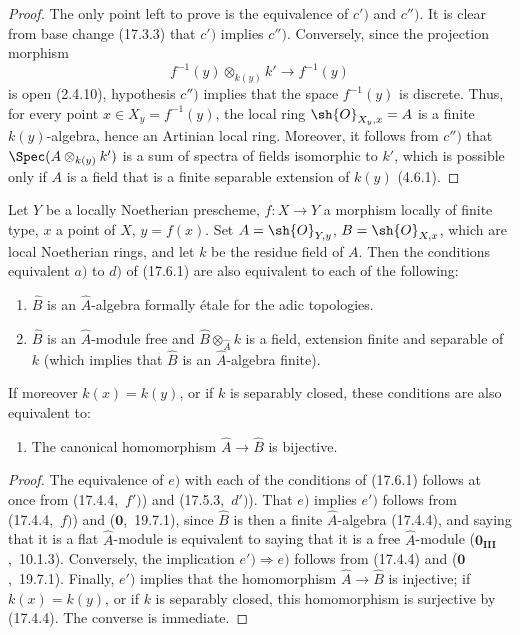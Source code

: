 \begin{proof}
The only point left to prove is the equivalence of $c')$ and $c'')$.
It is clear from base change (17.3.3) that $c')$ implies $c'')$.
Conversely, since the projection morphism
\[
f^{-1}(y)\otimes_{k(y)}k'\longrightarrow f^{-1}(y)
\]
is open (2.4.10), hypothesis $c'')$ implies that the space $f^{-1}(y)$ is discrete.
Thus, for every point $x\in X_y=f^{-1}(y)$, the local ring $\sh{O}_{X_y,x}=A$ is a finite $k(y)$-algebra, hence an Artinian local ring.
Moreover, it follows from $c'')$ that $\Spec(A\otimes_{k(y)}k')$ is a sum of spectra of fields isomorphic to $k'$, which is possible only if $A$ is a field that is a finite separable extension of $k(y)$ (4.6.1).
\end{proof}

\begin{proposition}[17.6.3]
\label{IV.17.6.3}
Let $Y$ be a locally Noetherian prescheme, $f:X\to Y$ a morphism locally of finite type, $x$ a point of $X$, $y=f(x)$.
Set $A=\sh{O}_{Y,y}$, $B=\sh{O}_{X,x}$, which are local Noetherian rings, and let $k$ be the residue field of $A$.
Then the conditions equivalent $a)$ to $d)$ of (17.6.1) are also equivalent to each of the following:
\begin{enumerate}
  \item[e)] $\hat{B}$ is an $\hat{A}$-algebra formally \'etale for the adic topologies.
  \item[e')] $\hat{B}$ is an $\hat{A}$-module free and $\hat{B}\otimes_{\hat{A}}k$ is a field, extension finite and separable of $k$ (which implies that $\hat{B}$ is an $\hat{A}$-algebra finite).
\end{enumerate}
If moreover $k(x)=k(y)$, or if $k$ is separably closed, these conditions are also equivalent to:
\begin{enumerate}
  \item[e'')] The canonical homomorphism $\hat{A}\to\hat{B}$ is bijective.
\end{enumerate}
\end{proposition}

\begin{proof}
The equivalence of $e)$ with each of the conditions of (17.6.1) follows at once from (17.4.4,~$f')$) and (17.5.3,~$d')$).
That $e)$ implies $e')$ follows from (17.4.4,~$f)$) and ($\mathbf{0}$,~19.7.1), since $\hat{B}$ is then a finite $\hat{A}$-algebra (17.4.4), and saying that it is a flat $\hat{A}$-module is equivalent to saying that it is a free $\hat{A}$-module ($\mathbf{0}_\mathbf{III}$,~10.1.3).
Conversely, the implication $e')\Rightarrow e)$ follows from (17.4.4) and ($\mathbf{0}$,~19.7.1).
Finally, $e')$ implies that the homomorphism $\hat{A}\to\hat{B}$ is injective; if $k(x)=k(y)$, or if $k$ is separably closed, this homomorphism is surjective by (17.4.4).
The converse is immediate.
\end{proof}

